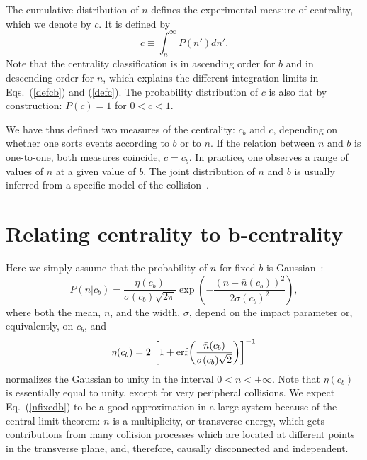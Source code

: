 \documentclass[aps,prc,twocolumn,superscriptaddress,showpacs,floatfix,nofootinbib]{revtex4-1}
\begin{document}
The cumulative distribution of $n$ defines the experimental measure of centrality, which we denote by $c$. 
It is defined by 
\begin{equation}
\label{defc}
c\equiv \int_n^\infty P(n')dn'.
\end{equation} 
Note that the centrality classification is in ascending order for $b$ and in descending order for $n$, which explains the different integration limits in Eqs.~(\ref{defcb}) and (\ref{defc}). 
The probability distribution of $c$ is also flat by construction: $P(c)=1$ for $0<c<1$. 

We have thus defined two measures of the centrality: $c_b$ and $c$, depending on whether one sorts events according to $b$ or to $n$. 
If the relation between $n$ and $b$ is one-to-one, both measures coincide, $c=c_b$.  
In practice, one observes a range of values of $n$ at a given value of $b$. 
The joint distribution of $n$ and $b$ is usually inferred from a specific model of the collision~\cite{Wang:1991hta,Miller:2007ri}. 

\section{Relating centrality to $\boldsymbol{b}$-centrality}
\label{s:gaussian}

Here we simply assume that the probability of $n$ for fixed $b$ is Gaussian~\cite{Broniowski:2001ei}:  
\begin{equation}
\label{nfixedb}
P(n|c_b)=\frac{ \eta(c_b)}{\sigma(c_b)\sqrt{2\pi}}
\exp\left(-\frac{(n-\bar n(c_b))^2}{2\sigma(c_b)^2}\right),
\end{equation}
where both the mean, $\bar n$, and the width, $\sigma$, depend on the
impact parameter or, equivalently, on $c_b$, and
\begin{equation}
\eta(c_b) = 2 ~ \biggl[1+{\rm erf} \biggl( \frac{\bar n(c_b)}{\sigma(c_b)\sqrt{2}}\biggr)   \biggr]^{-1}
\end{equation}
normalizes the Gaussian to unity in the interval $0 < n < +\infty$.
Note that $\eta(c_b)$ is essentially equal to unity, except for very peripheral collisions.
We expect Eq.~(\ref{nfixedb}) to be a good approximation in a large system because of the
central limit theorem: $n$ is a multiplicity, or transverse energy,
which gets contributions from many collision processes which are  
located at different points in the transverse plane, and, therefore, causally disconnected and independent. 
\end{document}
